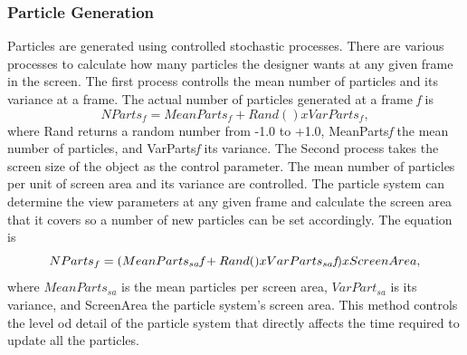\subsubsection{Particle Generation}
Particles are generated using controlled stochastic processes. There are various processes to calculate how many particles the designer wants at any given frame in the screen. The first process controlls the mean number of particles and its variance at a frame. The actual number of particles generated at a frame \emph{f} is 
\begin{equation}
\label{eqn:01}
	NParts_{f} = MeanParts_{f} + Rand() x VarParts_{f},
\end{equation}
where Rand returns a random number from -1.0 to +1.0, MeanParts\emph{f} the mean number of particles, and VarParts\emph{f} its variance.
	The Second process takes the screen size of the object as the control parameter. The mean number of particles per unit of screen area and its variance are controlled. The particle system can determine the view parameters at any given frame and calculate the screen area that it covers so a number of new particles can be set accordingly. The equation is
\begin{equation}
\label{eqn:01}
	NParts_{f} = (MeanParts_{sa}\emph{f} + Rand() x VarParts_{sa}\emph{f}) x ScreenArea,
\end{equation}
where $MeanParts_{sa}$ is the mean particles per screen area, $VarPart_{sa}$ is its variance, and ScreenArea the particle system's screen area. This method controls the level od detail of the particle system that directly affects the time required to update all the particles.
	

